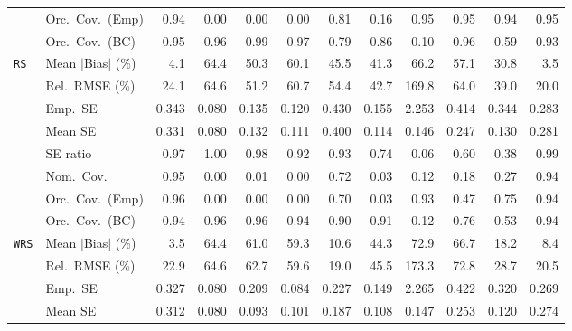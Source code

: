 \begin{landscape}
\begin{longtable}{llrrrrrrrrrr}
 & Orc.\ Cov.\ (Emp) & \cellcolor{ranktwo}0.94 & 0.00 & 0.00 & 0.00 & \cellcolor{rankthree}0.81 & 0.16 & \cellcolor{rankone}0.95 & \cellcolor{rankone}0.95 & \cellcolor{ranktwo}0.94 & \cellcolor{rankone}0.95 \\
 & Orc.\ Cov.\ (BC) & \cellcolor{rankone}0.95 & \cellcolor{ranktwo}0.96 & 0.99 & \cellcolor{rankthree}0.97 & 0.79 & 0.86 & 0.10 & \cellcolor{ranktwo}0.96 & 0.59 & \cellcolor{rankthree}0.93 \\
\addlinespace[2pt]
\quad \texttt{RS} & Mean $|$Bias$|$ (\%) & \cellcolor{ranktwo}4.1 & 64.4 & 50.3 & 60.1 & 45.5 & 41.3 & 66.2 & 57.1 & \cellcolor{rankthree}30.8 & \cellcolor{rankone}3.5 \\
 & Rel.\ RMSE (\%) & \cellcolor{ranktwo}24.1 & 64.6 & 51.2 & 60.7 & 54.4 & 42.7 & 169.8 & 64.0 & \cellcolor{rankthree}39.0 & \cellcolor{rankone}20.0 \\
 & Emp.\ SE & 0.343 & 0.080 & 0.135 & 0.120 & 0.430 & 0.155 & 2.253 & 0.414 & 0.344 & 0.283 \\
 & Mean SE & 0.331 & 0.080 & 0.132 & 0.111 & 0.400 & 0.114 & 0.146 & 0.247 & 0.130 & 0.281 \\
 & SE ratio & 0.97 & \cellcolor{rankone}1.00 & \cellcolor{rankthree}0.98 & 0.92 & 0.93 & 0.74 & 0.06 & 0.60 & 0.38 & \cellcolor{ranktwo}0.99 \\
 & Nom.\ Cov. & \cellcolor{rankone}0.95 & 0.00 & 0.01 & 0.00 & \cellcolor{rankthree}0.72 & 0.03 & 0.12 & 0.18 & 0.27 & \cellcolor{ranktwo}0.94 \\
 & Orc.\ Cov.\ (Emp) & \cellcolor{rankone}0.96 & 0.00 & 0.00 & 0.00 & 0.70 & 0.03 & \cellcolor{ranktwo}0.93 & 0.47 & \cellcolor{rankthree}0.75 & \cellcolor{rankone}0.94 \\
 & Orc.\ Cov.\ (BC) & \cellcolor{rankone}0.94 & \cellcolor{rankone}0.96 & \cellcolor{rankone}0.96 & \cellcolor{rankone}0.94 & \cellcolor{rankthree}0.90 & \cellcolor{ranktwo}0.91 & 0.12 & 0.76 & 0.53 & \cellcolor{rankone}0.94 \\
\addlinespace[2pt]
\quad \texttt{WRS} & Mean $|$Bias$|$ (\%) & \cellcolor{rankone}3.5 & 64.4 & 61.0 & 59.3 & \cellcolor{rankthree}10.6 & 44.3 & 72.9 & 66.7 & 18.2 & \cellcolor{ranktwo}8.4 \\
 & Rel.\ RMSE (\%) & \cellcolor{rankthree}22.9 & 64.6 & 62.7 & 59.6 & \cellcolor{rankone}19.0 & 45.5 & 173.3 & 72.8 & 28.7 & \cellcolor{ranktwo}20.5 \\
 & Emp.\ SE & 0.327 & 0.080 & 0.209 & 0.084 & 0.227 & 0.149 & 2.265 & 0.422 & 0.320 & 0.269 \\
 & Mean SE & 0.312 & 0.080 & 0.093 & 0.101 & 0.187 & 0.108 & 0.147 & 0.253 & 0.120 & 0.274 \\

\end{longtable}
\end{landscape}
